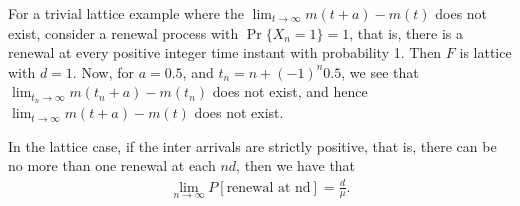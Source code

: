 \documentclass[a4paper,10pt,english]{article}
\begin{document}
\begin{shaded*}
For a trivial lattice example where the $\lim_{t\to \infty} m(t+a)-m(t)$ does not exist, consider a renewal process with $\Pr\{X_n = 1\} = 1$, that is, there is a renewal at every positive integer time instant with probability 1. Then $F$ is lattice with $d=1.$ Now, for $a=0.5$, and $t_n = n+(-1)^n 0.5$, we see that $\lim_{t_n \to \infty} m(t_n+a)-m(t_n)$ does not exist, and hence $\lim_{t \to \infty} m(t+a)-m(t)$ does not exist.
\end{shaded*}

In the lattice case, if the inter arrivals are strictly positive, that is, there can be no more than one renewal at each $nd$, then we have that 
\begin{align}
\lim_{n\to \infty} P[{\text{renewal at nd}}] = \frac{d}{\mu}.
\end{align}
\end{document}
